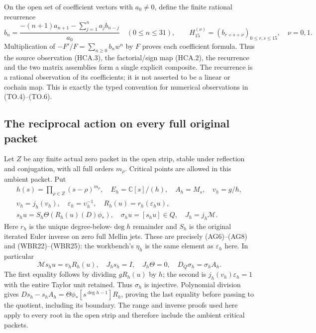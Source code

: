 On the open set of coefficient vectors with $a_0\ne0$, define the
finite rational recurrence
\[
 b_n=\frac{-(n+1)a_{n+1}-\sum_{j=1}^na_jb_{n-j}}{a_0}
 \quad(0\leq n\leq31),\qquad
 H_{15}^{(\nu)}=(b_{r+s+\nu})_{0\leq r,s\leq15},\quad\nu=0,1.
 \tag{HCA.4}
\]
Multiplication of $-F'/F=\sum_{n\geq0}b_nw^n$ by $F$ proves
each coefficient formula. Thus the source observation (HCA.3),
the factorial/sign map (HCA.2), the recurrence and the two matrix
assemblies form a single explicit composite. The recurrence is a
rational observation of its coefficients; it is not asserted to
be a linear or cochain map. This is exactly the typed convention
for numerical observations in (TO.4)--(TO.6).

\subsection{The reciprocal action on every full original packet}

Let $Z$ be any finite actual zero packet in the open strip, stable
under reflection and conjugation, with all full orders $m_\rho$.
Critical points are allowed in this ambient packet. Put
\[
 \begin{gathered}
 h(s)=\prod_{\rho\in Z}(s-\rho)^{m_\rho},\quad
 E_h=\mathbb{C}[s]/(h),\quad A_h=M_s,\quad v_h=g/h,\\
 \upsilon_h=j_h(v_h),\quad\varepsilon_h=\upsilon_h^{-1},\quad
 R_h(u)=r_h(\varepsilon_hu),\\
 s_hu=S_h\Theta(R_h(u)(D)\phi_*),\quad
 \sigma_hu=[s_hu]\in Q,\quad J_h=j_h\mathcal M.
 \end{gathered}
 \tag{HCA.5}
\]
Here $r_h$ is the unique degree-below-$\deg h$ remainder and $S_h$
is the original iterated Euler inverse on zero full Mellin jets.
These are precisely (AG6)--(AG8) and (WBR22)--(WBR25): the
workbench's $\eta_h$ is the same element as $\varepsilon_h$ here.
In particular
\[
 \mathcal Ms_hu=v_hR_h(u),\quad J_hs_h=I,
 \quad J_h\Theta=0,\quad D_Q\sigma_h=\sigma_hA_h.
 \tag{HCA.6}
\]
The first equality follows by dividing $gR_h(u)$ by $h$; the
second is $j_h(v_h)\varepsilon_h=1$ with the entire Taylor unit
retained. Thus $\sigma_h$ is injective. Polynomial division gives
$Ds_h-s_hA_h=\Theta\phi_*[s^{\deg h-1}]R_h$, proving the
last equality before passing to the quotient, including its boundary.
The range and inverse proofs used here apply to every root in
the open strip and therefore include the ambient critical packets.

